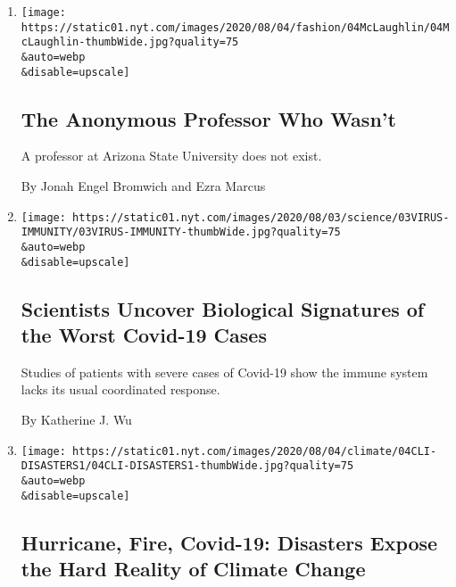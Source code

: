 \begin{enumerate}
\def\labelenumi{\arabic{enumi}.}
\item
  \href{/2020/08/04/style/college-coronavirus-hoax.html}{}

  \texttt{[image: https://static01.nyt.com/images/2020/08/04/fashion/04McLaughlin/04McLaughlin-thumbWide.jpg?quality=75\\\&auto=webp\\\&disable=upscale]}

  \hypertarget{the-anonymous-professor-who-wasnt}{%
  \subsection{The Anonymous Professor Who
  Wasn't}\label{the-anonymous-professor-who-wasnt}}

  A professor at Arizona State University does not exist.

  By Jonah Engel Bromwich and Ezra Marcus
\item
  \href{/2020/08/04/health/coronavirus-immune-system.html}{}

  \texttt{[image: https://static01.nyt.com/images/2020/08/03/science/03VIRUS-IMMUNITY/03VIRUS-IMMUNITY-thumbWide.jpg?quality=75\\\&auto=webp\\\&disable=upscale]}

  \hypertarget{scientists-uncover-biological-signatures-of-the-worst-covid-19-cases}{%
  \subsection{Scientists Uncover Biological Signatures of the Worst
  Covid-19
  Cases}\label{scientists-uncover-biological-signatures-of-the-worst-covid-19-cases}}

  Studies of patients with severe cases of Covid-19 show the immune
  system lacks its usual coordinated response.

  By Katherine J. Wu
\item
  \href{/2020/08/04/climate/hurricane-isaias-apple-fire-climate.html}{}

  \texttt{[image: https://static01.nyt.com/images/2020/08/04/climate/04CLI-DISASTERS1/04CLI-DISASTERS1-thumbWide.jpg?quality=75\\\&auto=webp\\\&disable=upscale]}

  \hypertarget{hurricane-fire-covid-19-disasters-expose-the-hard-reality-of-climate-change}{%
  \subsection{Hurricane, Fire, Covid-19: Disasters Expose the Hard
  Reality of Climate
  Change}\label{hurricane-fire-covid-19-disasters-expose-the-hard-reality-of-climate-change}}


\end{enumerate}

